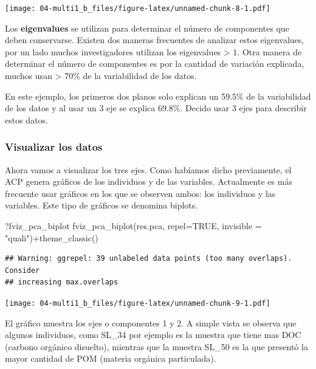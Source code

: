 \documentclass[
]{book}
\newenvironment{Shaded}{\begin{snugshade}}{\end{snugshade}}
\newcommand{\AttributeTok}[1]{\textcolor[rgb]{0.77,0.63,0.00}{#1}}
\newcommand{\ConstantTok}[1]{\textcolor[rgb]{0.00,0.00,0.00}{#1}}
\newcommand{\FunctionTok}[1]{\textcolor[rgb]{0.00,0.00,0.00}{#1}}
\newcommand{\NormalTok}[1]{#1}
\newcommand{\SpecialCharTok}[1]{\textcolor[rgb]{0.00,0.00,0.00}{#1}}
\newcommand{\StringTok}[1]{\textcolor[rgb]{0.31,0.60,0.02}{#1}}
\begin{document}
\texttt{[image: 04-multi1\_b\_files/figure-latex/unnamed-chunk-8-1.pdf]}

Los \textbf{eigenvalues} se utilizan para determinar el número de componentes que deben conservarse. Existen dos maneras frecuentes de analizar estos eigenvalues, por un lado muchos investigadores utilizan los eigenvalues \textgreater{} 1. Otra manera de determinar el número de componentes es por la cantidad de variación explicada, muchos usan \textgreater{} 70\% de la variabilidad de los datos.

En este ejemplo, los primeros dos planos solo explican un 59.5\% de la variabilidad de los datos y al usar un 3 eje se explica 69.8\%. Decido usar 3 ejes para describir estos datos.

\hypertarget{visualizar-los-datos}{%
\subsubsection{Visualizar los datos}\label{visualizar-los-datos}}

Ahora vamos a visualizar los tres ejes. Como habíamos dicho previamente, el ACP genera gráficos de los individuos y de las variables. Actualmente es más frecuente usar gráficos en los que se observen ambos: los individuos y las variables. Este tipo de gráficos se denomina biplots.

\begin{Shaded}
\begin{Highlighting}[]
\NormalTok{?fviz\_pca\_biplot}
\FunctionTok{fviz\_pca\_biplot}\NormalTok{(res.pca,  }\AttributeTok{repel=}\ConstantTok{TRUE}\NormalTok{, }\AttributeTok{invisible =} \StringTok{"quali"}\NormalTok{)}\SpecialCharTok{+}\FunctionTok{theme\_classic}\NormalTok{()}
\end{Highlighting}
\end{Shaded}

\begin{verbatim}
## Warning: ggrepel: 39 unlabeled data points (too many overlaps). Consider
## increasing max.overlaps
\end{verbatim}

\texttt{[image: 04-multi1\_b\_files/figure-latex/unnamed-chunk-9-1.pdf]}

El gráfico muestra los ejes o componentes 1 y 2. A simple vista se observa que algunos individuos, como SL\_34 por ejemplo es la muestra que tiene mas DOC (carbono orgánico disuelto), mientras que la muestra SL\_50 es la que presentó la mayor cantidad de POM (materia orgánica particulada).
\end{document}
